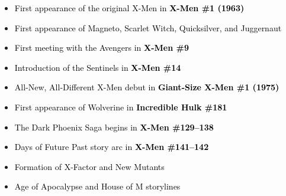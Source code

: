 \documentclass[12pt]{article}
\begin{document}
\begin{center}
\begin{tcolorbox}[colback=white!95!gray, colframe=black,
                  width=0.9\textwidth, arc=4mm, auto outer arc,
                  boxrule=0.8pt]
\begin{itemize}[left=0pt]
    \item \textcolor{black}{First appearance of the original X-Men in \textbf{X-Men \#1 (1963)}}
    \item \textcolor{black}{First appearance of Magneto, Scarlet Witch, Quicksilver, and Juggernaut}
    \item \textcolor{black}{First meeting with the Avengers in \textbf{X-Men \#9}}
    \item \textcolor{black}{Introduction of the Sentinels in \textbf{X-Men \#14}}
    \item \textcolor{black}{All-New, All-Different X-Men debut in \textbf{Giant-Size X-Men \#1 (1975)}}
    \item \textcolor{black}{First appearance of Wolverine in \textbf{Incredible Hulk \#181}}
    \item \textcolor{black}{The Dark Phoenix Saga begins in \textbf{X-Men \#129–138}}
    \item \textcolor{black}{Days of Future Past story arc in \textbf{X-Men \#141–142}}
    \item \textcolor{black}{Formation of X-Factor and New Mutants}
    \item \textcolor{black}{Age of Apocalypse and House of M storylines}
\end{itemize}
\end{tcolorbox}
\end{center}

\newpage
{}
\end{document}
